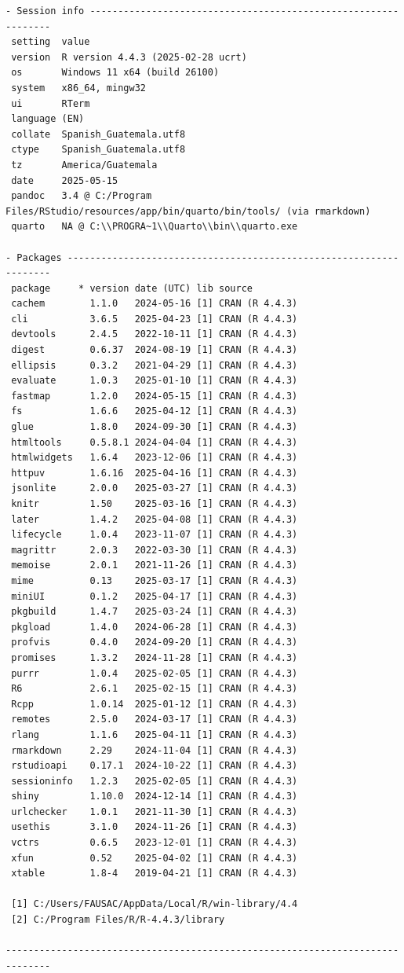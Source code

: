 \documentclass[
  spanish,
  a4paper,
  DIV=11,
  numbers=noendperiod,
  onepage,
  openany]{scrreprt}
\begin{document}
\begin{verbatim}
- Session info ---------------------------------------------------------------
 setting  value
 version  R version 4.4.3 (2025-02-28 ucrt)
 os       Windows 11 x64 (build 26100)
 system   x86_64, mingw32
 ui       RTerm
 language (EN)
 collate  Spanish_Guatemala.utf8
 ctype    Spanish_Guatemala.utf8
 tz       America/Guatemala
 date     2025-05-15
 pandoc   3.4 @ C:/Program Files/RStudio/resources/app/bin/quarto/bin/tools/ (via rmarkdown)
 quarto   NA @ C:\\PROGRA~1\\Quarto\\bin\\quarto.exe

- Packages -------------------------------------------------------------------
 package     * version date (UTC) lib source
 cachem        1.1.0   2024-05-16 [1] CRAN (R 4.4.3)
 cli           3.6.5   2025-04-23 [1] CRAN (R 4.4.3)
 devtools      2.4.5   2022-10-11 [1] CRAN (R 4.4.3)
 digest        0.6.37  2024-08-19 [1] CRAN (R 4.4.3)
 ellipsis      0.3.2   2021-04-29 [1] CRAN (R 4.4.3)
 evaluate      1.0.3   2025-01-10 [1] CRAN (R 4.4.3)
 fastmap       1.2.0   2024-05-15 [1] CRAN (R 4.4.3)
 fs            1.6.6   2025-04-12 [1] CRAN (R 4.4.3)
 glue          1.8.0   2024-09-30 [1] CRAN (R 4.4.3)
 htmltools     0.5.8.1 2024-04-04 [1] CRAN (R 4.4.3)
 htmlwidgets   1.6.4   2023-12-06 [1] CRAN (R 4.4.3)
 httpuv        1.6.16  2025-04-16 [1] CRAN (R 4.4.3)
 jsonlite      2.0.0   2025-03-27 [1] CRAN (R 4.4.3)
 knitr         1.50    2025-03-16 [1] CRAN (R 4.4.3)
 later         1.4.2   2025-04-08 [1] CRAN (R 4.4.3)
 lifecycle     1.0.4   2023-11-07 [1] CRAN (R 4.4.3)
 magrittr      2.0.3   2022-03-30 [1] CRAN (R 4.4.3)
 memoise       2.0.1   2021-11-26 [1] CRAN (R 4.4.3)
 mime          0.13    2025-03-17 [1] CRAN (R 4.4.3)
 miniUI        0.1.2   2025-04-17 [1] CRAN (R 4.4.3)
 pkgbuild      1.4.7   2025-03-24 [1] CRAN (R 4.4.3)
 pkgload       1.4.0   2024-06-28 [1] CRAN (R 4.4.3)
 profvis       0.4.0   2024-09-20 [1] CRAN (R 4.4.3)
 promises      1.3.2   2024-11-28 [1] CRAN (R 4.4.3)
 purrr         1.0.4   2025-02-05 [1] CRAN (R 4.4.3)
 R6            2.6.1   2025-02-15 [1] CRAN (R 4.4.3)
 Rcpp          1.0.14  2025-01-12 [1] CRAN (R 4.4.3)
 remotes       2.5.0   2024-03-17 [1] CRAN (R 4.4.3)
 rlang         1.1.6   2025-04-11 [1] CRAN (R 4.4.3)
 rmarkdown     2.29    2024-11-04 [1] CRAN (R 4.4.3)
 rstudioapi    0.17.1  2024-10-22 [1] CRAN (R 4.4.3)
 sessioninfo   1.2.3   2025-02-05 [1] CRAN (R 4.4.3)
 shiny         1.10.0  2024-12-14 [1] CRAN (R 4.4.3)
 urlchecker    1.0.1   2021-11-30 [1] CRAN (R 4.4.3)
 usethis       3.1.0   2024-11-26 [1] CRAN (R 4.4.3)
 vctrs         0.6.5   2023-12-01 [1] CRAN (R 4.4.3)
 xfun          0.52    2025-04-02 [1] CRAN (R 4.4.3)
 xtable        1.8-4   2019-04-21 [1] CRAN (R 4.4.3)

 [1] C:/Users/FAUSAC/AppData/Local/R/win-library/4.4
 [2] C:/Program Files/R/R-4.4.3/library

------------------------------------------------------------------------------
\end{verbatim}
\end{document}
